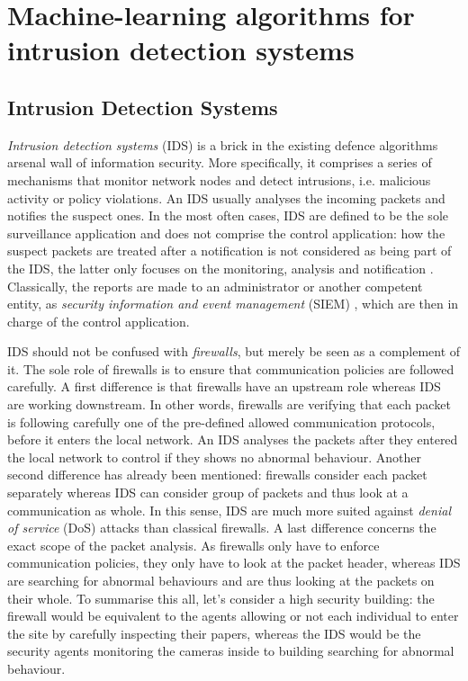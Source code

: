 \chapter{Machine-learning algorithms for intrusion detection systems}
\label{cha:2}

\section{Intrusion Detection Systems}
\emph{Intrusion detection systems} (IDS) is a brick in the existing defence algorithms arsenal wall of information security. More specifically, it comprises a series of mechanisms that monitor network nodes and detect intrusions, i.e. malicious activity or policy violations. An IDS usually analyses the incoming packets and notifies the suspect ones. In the most often cases, IDS are defined to be the sole surveillance application and does not comprise the control application: how the suspect packets are treated after a notification is not considered as being part of the IDS, the latter only focuses on the monitoring, analysis and notification \cite{Mukherjee1994NetworkDetection}. Classically, the reports are made to an administrator or another competent entity, as \emph{security information and event management} (SIEM) \cite{Bhatt2014TheSystems}, which are then in charge of the control application. 

IDS should not be confused with \emph{firewalls}, but merely be seen as a complement of it. The sole role of firewalls is to ensure that communication policies are followed carefully. A first
difference is that firewalls have an upstream role whereas IDS are working downstream. In other words, firewalls are verifying that each packet is following carefully one of the pre-defined allowed communication protocols, before it enters the local network. An IDS analyses the packets after they entered the local network to control if they shows no abnormal behaviour. Another second difference has already been mentioned: firewalls consider each packet separately whereas IDS can consider group of packets and thus look at a communication as whole. In this sense, IDS are much more suited against \emph{denial of service} (DoS) attacks than classical firewalls. A last difference concerns the exact scope of the packet analysis. As firewalls only have to enforce communication policies, they only have to look at the packet header, whereas IDS are searching for abnormal behaviours and are thus looking at the packets on their whole. To summarise this all, let's consider a high security building: the firewall would be equivalent to the agents allowing or not each individual to enter the site by carefully inspecting their papers, whereas the IDS would be the security agents monitoring the cameras inside to building searching for abnormal behaviour.


